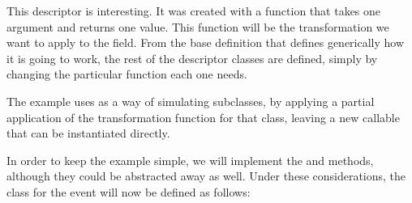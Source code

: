 \documentclass[a4paper,10pt,english]{sphinxmanual}
\begin{document}
\begin{sphinxVerbatim}[commandchars=\\\{\}]
       
        \PYG{p}{[}\PYG{p}{]}  
             
          
               
          
              
\end{sphinxVerbatim}

This descriptor is interesting. It was created with a function that takes one argument and
returns one value. This function will be the transformation we want to apply to the field.
From the base definition that defines generically how it is going to work, the rest of the
descriptor classes are defined, simply by changing the particular function each one
needs.

The example uses  as a way of simulating sub\sphinxhyphen{}classes, by applying a
partial application of the transformation function for that class, leaving a new callable that
can be instantiated directly.

In order to keep the example simple, we will implement the  and
 methods, although they could be abstracted away as well. Under these
considerations, the class for the event will now be defined as follows:
\end{document}
